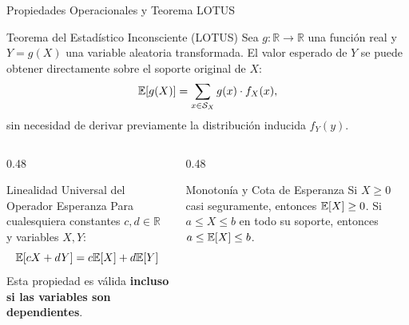 \documentclass[10pt, aspectratio=169]{beamer}
\begin{document}
\begin{frame}{Propiedades Operacionales y Teorema LOTUS}
  \begin{block}{Teorema del Estadístico Inconsciente (LOTUS)}
    \footnotesize
    Sea $g: \mathbb{R} \to \mathbb{R}$ una función real y $Y = g(X)$ una variable aleatoria transformada. El valor esperado de $Y$ se puede obtener directamente sobre el soporte original de $X$:
    $$\mathbb{E}[g(X)] = \sum_{x \in \mathcal{S}_X} g(x) \cdot f_X(x),$$
    sin necesidad de derivar previamente la distribución inducida $f_Y(y)$.
  \end{block}
  \vspace{-0.05cm}
  \pause
  \begin{columns}[T]
    \begin{column}{0.48\textwidth}
      \begin{exampleblock}{Linealidad Universal del Operador Esperanza}
        \footnotesize
        Para cualesquiera constantes $c, d \in \mathbb{R}$ y variables $X, Y$:
        $$\mathbb{E}[cX + dY] = c\mathbb{E}[X] + d\mathbb{E}[Y]$$
        Esta propiedad es válida \textbf{incluso si las variables son dependientes}.
      \end{exampleblock}
    \end{column}
    \begin{column}{0.48\textwidth}
      \begin{alertblock}{Monotonía y Cota de Esperanza}
        \footnotesize
        Si $X \ge 0$ casi seguramente, entonces $\mathbb{E}[X] \ge 0$. Si $a \le X \le b$ en todo su soporte, entonces $a \le \mathbb{E}[X] \le b$.
      \end{alertblock}
    \end{column}
  \end{columns}
\end{frame}
\end{document}
